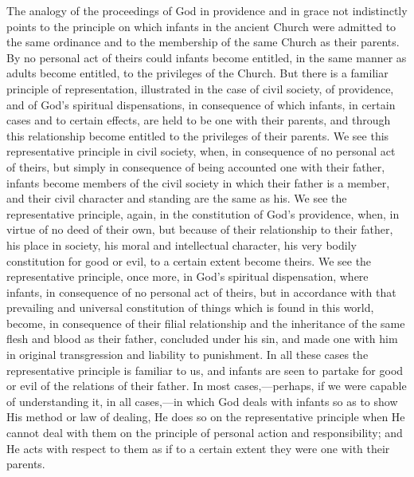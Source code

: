 \documentclass[]{book}
\begin{document}
The analogy of the proceedings of God in providence and in grace not indistinctly points to the principle on which infants in the ancient Church were admitted to the same ordinance and to the membership of the same Church as their parents. By no personal act of theirs could infants become entitled, in the same manner as adults become entitled, to the privileges of the Church. But there is a familiar principle of representation, illustrated in the case of civil society, of providence, and of God's spiritual dispensations, in consequence of which infants, in certain cases and to certain effects, are held to be one with their parents, and through this relationship become entitled to the privileges of their parents. We see this representative principle in civil society, when, in consequence of no personal act of theirs, but simply in consequence of being accounted one with their father, infants become members of the civil society in which their father is a member, and their civil character and standing are the same as his. We see the representative principle, again, in the constitution of God's providence, when, in virtue of no deed of their own, but because of their relationship to their father, his place in society, his moral and intellectual character, his very bodily constitution for good or evil, to a certain extent become theirs. We see the representative principle, once more, in God's spiritual dispensation, where infants, in consequence of no personal act of theirs, but in accordance with that prevailing and universal constitution of things which is found in this world, become, in consequence of their filial relationship and the inheritance of the same flesh and blood as their father, concluded under his sin, and made one with him in original transgression and liability to punishment. In all these cases the representative principle is familiar to us, and infants are seen to partake for good or evil of the relations of their father. In most cases,---perhaps, if we were capable of understanding it, in all cases,---in which God deals with infants so as to show His method or law of dealing, He does so on the representative principle when He cannot deal with them on the principle of personal action and responsibility; and He acts with respect to them as if to a certain extent they were one with their parents.
\end{document}
